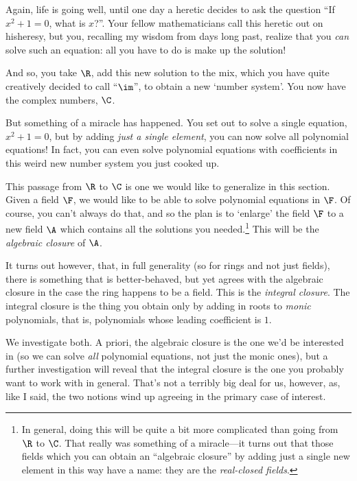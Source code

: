 Again, life is going well, until one day a heretic decides to ask the question ``If $x^2+1=0$, what is $x$?''.  Your fellow mathematicians call this heretic out on his\textellipsis heresy\textellipsis , but you, recalling my wisdom from days long past, realize that you \emph{can} solve such an equation:  all you have to do is make up the solution!

And so, you take $\R$, add this new solution to the mix, which you have quite creatively decided to call ``$\im$'', to obtain a new `number system'.  You now have the complex numbers, $\C$.

But something of a miracle has happened.  You set out to solve a single equation, $x^2+1=0$, but by adding \emph{just a single element}, you can now solve all polynomial equations!  In fact, you can even solve polynomial equations with coefficients in this weird new number system you just cooked up.

\horizontalrule

This passage from $\R$ to $\C$ is one we would like to generalize in this section.  Given a field $\F$, we would like to be able to solve polynomial equations in $\F$.  Of course, you can't always do that, and so the plan is to `enlarge' the field $\F$ to a new field $\A$ which contains all the solutions you needed.\footnote{In general, doing this will be quite a bit more complicated than going from $\R$ to $\C$.  That really was something of a miracle---it turns out that those fields which you can obtain an ``algebraic closure'' by adding just a single new element in this way have a name:  they are the \emph{real-closed fields}.}  This will be the \emph{algebraic closure} of $\A$.

It turns out however, that, in full generality (so for rings and not just fields), there is something that is better-behaved, but yet agrees with the algebraic closure in the case the ring happens to be a field.  This is the \emph{integral closure}.  The integral closure is the thing you obtain only by adding in roots to \emph{monic} polynomials, that is, polynomials whose leading coefficient is $1$.

We investigate both.  A priori, the algebraic closure is the one we'd be interested in (so we can solve \emph{all} polynomial equations, not just the monic ones), but a further investigation will reveal that the integral closure is the one you probably want to work with in general.  That's not a terribly big deal for us, however, as, like I said, the two notions wind up agreeing in the primary case of interest.

